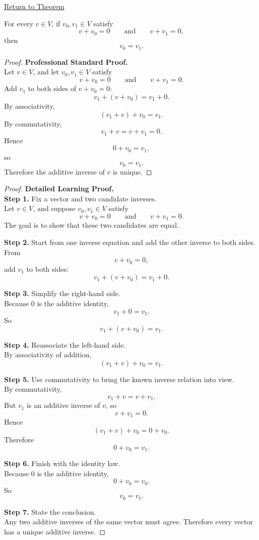 
\newpage
{}
\label{prf:unique-additive-inverse}

\begin{remark*}[Return]
\hyperref[thm:unique-additive-inverse]{Return to Theorem}
\end{remark*}

\begin{theorem*}
For every $v \in V$, if $v_0,v_1 \in V$ satisfy
\[
v+v_0=0
\qquad\text{and}\qquad
v+v_1=0,
\]
then
\[
v_0=v_1.
\]
\end{theorem*}

\begin{proof}
\textbf{Professional Standard Proof.}~\\
Let $v \in V$, and let $v_0,v_1 \in V$ satisfy
\[
v+v_0=0
\qquad\text{and}\qquad
v+v_1=0.
\]
Add $v_1$ to both sides of $v+v_0=0$:
\[
v_1+(v+v_0)=v_1+0.
\]
By associativity,
\[
(v_1+v)+v_0=v_1.
\]
By commutativity,
\[
v_1+v=v+v_1=0.
\]
Hence
\[
0+v_0=v_1,
\]
so
\[
v_0=v_1.
\]
Therefore the additive inverse of $v$ is unique.
\end{proof}

\begin{proof}
\textbf{Detailed Learning Proof.}~\\

\textbf{Step 1.} Fix a vector and two candidate inverses.\\
Let $v \in V$, and suppose $v_0,v_1 \in V$ satisfy
\[
v+v_0=0
\qquad\text{and}\qquad
v+v_1=0.
\]
The goal is to show that these two candidates are equal.

\textbf{Step 2.} Start from one inverse equation and add the other inverse to both sides.\\
From
\[
v+v_0=0,
\]
add $v_1$ to both sides:
\[
v_1+(v+v_0)=v_1+0.
\]

\textbf{Step 3.} Simplify the right-hand side.\\
Because $0$ is the additive identity,
\[
v_1+0=v_1.
\]
So
\[
v_1+(v+v_0)=v_1.
\]

\textbf{Step 4.} Reassociate the left-hand side.\\
By associativity of addition,
\[
(v_1+v)+v_0=v_1.
\]

\textbf{Step 5.} Use commutativity to bring the known inverse relation into view.\\
By commutativity,
\[
v_1+v=v+v_1.
\]
But $v_1$ is an additive inverse of $v$, so
\[
v+v_1=0.
\]
Hence
\[
(v_1+v)+v_0=0+v_0.
\]
Therefore
\[
0+v_0=v_1.
\]

\textbf{Step 6.} Finish with the identity law.\\
Because $0$ is the additive identity,
\[
0+v_0=v_0.
\]
So
\[
v_0=v_1.
\]

\textbf{Step 7.} State the conclusion.\\
Any two additive inverses of the same vector must agree. Therefore every vector has a unique additive inverse.
\end{proof}

